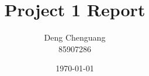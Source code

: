 %
%
%
%
%
%
%
%
%
%
%
%
%
%

\documentclass[11pt]{article}

\usepackage[english]{babel}
\usepackage[utf8]{inputenc}
\usepackage[colorlinks = true,
            linkcolor = blue,
            urlcolor  = blue]{hyperref}
\usepackage[a4paper,margin=1.5in]{geometry}
\usepackage{stackengine,graphicx}
\usepackage{fancyhdr}
\setlength{\headheight}{15pt}
\usepackage{microtype}
\usepackage{times}
\usepackage{booktabs}

\usepackage[numbered,framed]{matlab-prettifier}

\frenchspacing
\setlength{\parindent}{0cm} %
\setlength{\parskip}{0.3cm plus1mm minus1mm}

\pagestyle{fancy}
\fancyhf{}
\rfoot{\thepage}

\title{\vspace{-1cm}Project 1 Report}
\author{Deng Chenguang \\ 85907286}
\date{\today}



\maketitle
\vspace{-1.5cm}
\thispagestyle{fancy}

